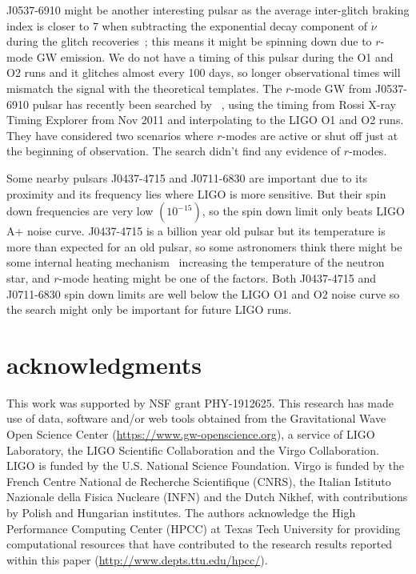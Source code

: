 \documentclass{ttuthes2007}
\begin{document}
J0537-6910 might be another interesting pulsar as the average inter-glitch
braking index is closer to 7 when subtracting the exponential decay component of
$\dot{\nu}$ during the glitch recoveries~\cite{Andersson_2018,Ferdman_2018};
this means it might be spinning down due to $r$-mode \ac{GW} emission. We do not
have a timing of this pulsar during the \ac{O1} and \ac{O2} runs and it glitches
almost every 100 days, so longer observational times will mismatch the signal
with the theoretical templates. The $r$-mode \ac{GW} from J0537-6910 pulsar has
recently been searched by ~\citet{Fesik2020}, using the timing from Rossi X-ray
Timing Explorer from Nov 2011 and interpolating to the LIGO \ac{O1} and \ac{O2}
runs. They have considered two scenarios where $r$-modes are active or shut off
just at the beginning of observation. The search didn't find any evidence of
$r$-modes.  

Some nearby pulsars J0437-4715 and J0711-6830 are important due to its proximity
and its frequency lies where \ac{LIGO} is more sensitive. But their spin down
frequencies are very low $(10^{-15})$, so the spin down limit only beats LIGO A+
noise curve. J0437-4715 is a billion year old pulsar but its temperature is
more than expected for an old pulsar, so some astronomers think there might be
some internal heating mechanism~\cite{Durant_2012} increasing the temperature of
the neutron star, and $r$-mode heating might be one of the factors. Both
J0437-4715 and J0711-6830 spin down limits are well below the LIGO \ac{O1} and
\ac{O2} noise curve so the search might only be important for future LIGO runs.  

\section*{acknowledgments}
This work was supported by NSF grant PHY-1912625.
This research has made use of data, software and/or web tools obtained from the
Gravitational Wave Open Science Center (\url{https://www.gw-openscience.org}), a
service of LIGO Laboratory, the LIGO Scientific Collaboration and the Virgo
Collaboration. LIGO is funded by the U.S. National Science Foundation. Virgo is
funded by the French Centre National de Recherche Scientifique (CNRS), the
Italian Istituto Nazionale della Fisica Nucleare (INFN) and the Dutch Nikhef,
with contributions by Polish and Hungarian institutes. The authors acknowledge
the High Performance Computing Center (HPCC) at Texas Tech University for
providing computational resources that have contributed to the research results
reported within this paper (\url{http://www.depts.ttu.edu/hpcc/}).
\end{document}
